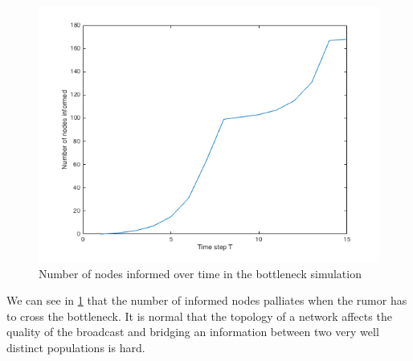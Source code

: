 \documentclass[10pt,journal,a4paper]{IEEEtran}
\begin{document}
\begin{figure}
\centering
\includegraphics[width=1\linewidth]{figs/split-chart}
\caption{Number of nodes informed over time in the bottleneck simulation}
\label{fig:split-chart}
\end{figure}

We can see in \cref{fig:split-chart} that the number of informed nodes palliates when the rumor has to cross the bottleneck. It is normal that the topology of a network affects the quality of the broadcast and bridging an information between two very well distinct populations is hard.


\end{document}
